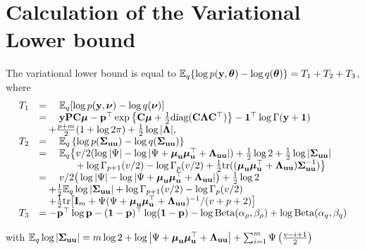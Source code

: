 \section{Calculation of the Variational Lower bound} 
\label{sec:calculation_of_var_lb}
		
The variational lower bound is equal to ${\mathbb E}_q\{\log{p({\bf y}, {\boldsymbol\theta})} - \log{q({\boldsymbol\theta})}\} = T_1 + T_2 + T_3$,
where
\begin{equation*}
\begin{array}{rl}
	T_1 & = \quad \bE_q[\log{p(\vy, \vnu)} - \log{q(\vnu)}]\\
	    & = \quad \vy \mP \mC \vmu - \vp^\top \exp{\left\{ \mC \vmu + \frac{1}{2} \text{diag} (\mC \mLambda \mC^\top) \right\}} - \vone^\top\log \Gamma{(\vy + \vone)}\\
	    & \quad + \frac{p + m}{2} (1 + \log{2 \pi}) + \frac{1}{2} \log{|\mLambda|},\\
	T_2 & = \quad \bE_q \left\{ \log p(\mSigma_{\vu \vu}) - \log q(\mSigma_{\vu \vu}) \right\}\\
	    & = \quad \bE_q \big\{ v/2(\log |\Psi| - \log |\Psi + \vmu_\vu \vmu_\vu^\top + \mLambda_{\vu \vu}|) + \frac{1}{2} \log 2 + \frac{1}{2} \log|\mSigma_{\vu \vu}| \\
	    & \qquad \hphantom{\bE_q \{} + \log \Gamma_{p+1}(v/2) - \log \Gamma_{p}(v/2)    
	    + \frac{1}{2} \tr((\vmu_{\vu} \vmu_{\vu}^\top + \mLambda_{\vu \vu}) \mSigma_{\vu \vu}^{-1}) \big\} \\
	    & = \quad v/2\big(\log |\Psi| - \log |\Psi + \vmu_\vu \vmu_\vu^\top + \mLambda_{\vu \vu}|\big) + \frac{1}{2} \log 2 \\
	    & \quad + \frac{1}{2} \bE_q \log |\mSigma_{\vu \vu}| + \log \Gamma_{p+1}(v/2) - \log \Gamma_{p}(v/2) \\
	    & \quad + \frac{1}{2} \tr\big[\mI_m + \Psi(\Psi+ \vmu_\vu \vmu_\vu^\top + \mLambda_{\vu \vu})^{-1}/(v + p + 2)\big] \\
	T_3 & = - \vp^\top \log \vp - (\vone - \vp)^\top \log (\vone - \vp) - \log \Beta (\alpha_\rho, \beta_\rho) + \log \Beta (\alpha_q, \beta_q)                                                              
\end{array}
\end{equation*}
		
\noindent with ${\mathbb E}_q \log |{\boldsymbol \Sigma}_{{\bf u} {\bf u}}| = m \log 2 + \log \left | \Psi + {\boldsymbol \mu}_{\bf u} {\boldsymbol \mu}_{\bf u}^\top + {\boldsymbol \Lambda}_{{\bf u} {\bf u}} \right | + \sum_{i=1}^m \Psi \left ( \frac{v - i + 1}{2} \right )$

